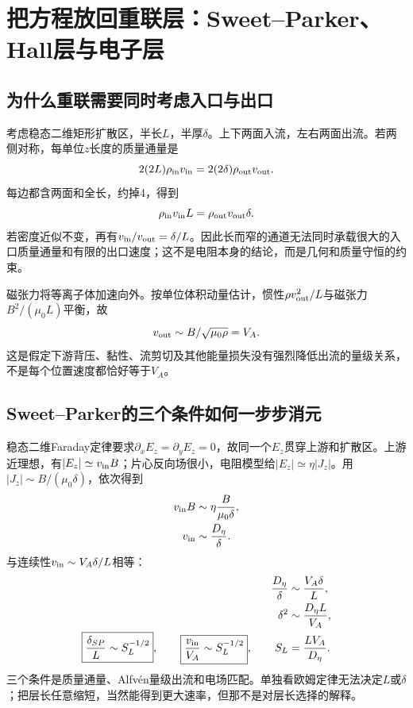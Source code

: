 \chapter{把方程放回重联层：Sweet--Parker、Hall层与电子层}
\label{hall:reconnection}
\section{为什么重联需要同时考虑入口与出口}
考虑稳态二维矩形扩散区，半长$L$，半厚$\delta$。上下两面入流，左右两面出流。若两侧对称，每单位$z$长度的质量通量是
\begin{equation}
2(2L)\rho_{\rm in}v_{\rm in}=2(2\delta)\rho_{\rm out}v_{\rm out}.
\end{equation}
每边都含两面和全长，约掉4，得到
\begin{equation}\rho_{\rm in}v_{\rm in}L=\rho_{\rm out}v_{\rm out}\delta.\end{equation}
若密度近似不变，再有$v_{\rm in}/v_{\rm out}=\delta/L$。因此长而窄的通道无法同时承载很大的入口质量通量和有限的出口速度；这不是电阻本身的结论，而是几何和质量守恒的约束。

磁张力将等离子体加速向外。按单位体积动量估计，惯性$\rho v_{\rm out}^2/L$与磁张力$B^2/(\mu_0L)$平衡，故
\begin{equation}v_{\rm out}\sim B/\sqrt{\mu_0\rho}=V_A.\end{equation}
这是假定下游背压、黏性、流剪切及其他能量损失没有强烈降低出流的量级关系，不是每个位置速度都恰好等于$V_A$。

\section{Sweet--Parker的三个条件如何一步步消元}
稳态二维Faraday定律要求$\partial_xE_z=\partial_yE_z=0$，故同一个$E_z$贯穿上游和扩散区。上游近理想，有$|E_z|\simeq v_{\rm in}B$；片心反向场很小，电阻模型给$|E_z|\simeq\eta|J_z|$。用$|J_z|\sim B/(\mu_0\delta)$，依次得到
\begin{align}
v_{\rm in}B&\sim\eta\frac{B}{\mu_0\delta},\\
v_{\rm in}&\sim\frac{D_\eta}{\delta}.
\end{align}
与连续性$v_{\rm in}\sim V_A\delta/L$相等：
\begin{align}
\frac{D_\eta}{\delta}&\sim\frac{V_A\delta}{L},\\
\delta^2&\sim\frac{D_\eta L}{V_A},\\
\boxed{\frac{\delta_{SP}}L\sim S_L^{-1/2}},\qquad
\boxed{\frac{v_{\rm in}}{V_A}\sim S_L^{-1/2}},\qquad S_L&=\frac{LV_A}{D_\eta}.
\end{align}
三个条件是质量通量、Alfvén量级出流和电场匹配。单独看欧姆定律无法决定$L$或$\delta$；把层长任意缩短，当然能得到更大速率，但那不是对层长选择的解释。

